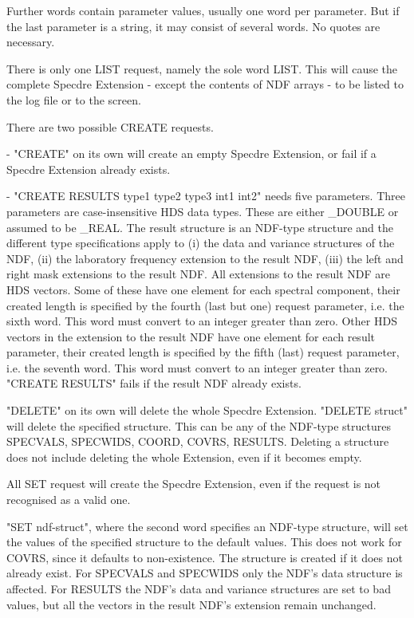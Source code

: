 \begin{description}
\begin{description}
   Further words contain parameter values, usually one word per
   parameter. But if the last parameter is a string, it may
   consist of several words. No quotes are necessary.

   There is only one LIST request, namely the sole word LIST. This
   will cause the complete Specdre Extension - except the contents of
   NDF arrays - to be listed to the log file or to the screen.

   There are two possible CREATE requests.

   -  "CREATE" on its own will create an empty Specdre Extension,
      or fail if a Specdre Extension already exists.

   -  "CREATE RESULTS type1 type2 type3 int1 int2" needs five
      parameters. Three parameters are case-insensitive HDS data
      types. These are either \_DOUBLE or assumed to be \_REAL. The
      result structure is an NDF-type structure and the different
      type specifications apply to (i) the data and variance
      structures of the NDF, (ii) the laboratory frequency
      extension to the result NDF, (iii) the left and right mask
      extensions to the result NDF. All extensions to the result
      NDF are HDS vectors. Some of these have one element for
      each spectral component, their created length is specified
      by the fourth (last but one) request parameter, i.e. the
      sixth word. This word must convert to an integer greater
      than zero. Other HDS vectors in the extension to the result
      NDF have one element for each result parameter, their
      created length is specified by the fifth (last) request
      parameter, i.e. the seventh word. This word must convert to
      an integer greater than zero. "CREATE RESULTS" fails if the
      result NDF already exists.

   "DELETE" on its own will delete the whole Specdre Extension.
   "DELETE struct" will delete the specified structure. This can be
   any of the NDF-type structures SPECVALS, SPECWIDS, COORD,
   COVRS, RESULTS. Deleting a structure does not include deleting
   the whole Extension, even if it becomes empty.

   All SET request will create the Specdre Extension, even if the
   request is not recognised as a valid one.

   "SET ndf-struct", where the second word specifies an NDF-type
   structure, will set the values of the specified structure to
   the default values. This does not work for COVRS, since it
   defaults to non-existence. The structure is created if it does
   not already exist. For SPECVALS and SPECWIDS only the NDF's data
   structure is affected. For RESULTS the NDF's data and variance
   structures are set to bad values, but all the vectors in the
   result NDF's extension remain unchanged.


\end{description}
\end{description}
